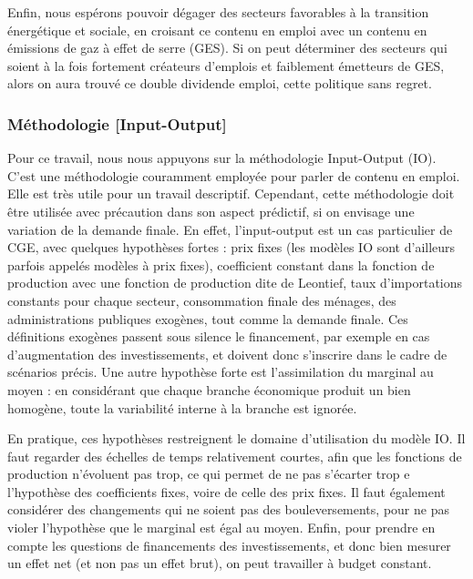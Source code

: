 Enfin, nous espérons pouvoir dégager des secteurs favorables à la transition énergétique et sociale, en croisant ce contenu en emploi avec un contenu en émissions de gaz à effet de serre (GES). Si on peut déterminer des secteurs qui soient à la fois fortement créateurs d’emplois et faiblement émetteurs de GES, alors on aura trouvé ce double dividende emploi, cette politique sans regret. 

\subsubsection{Méthodologie [Input-Output]}
Pour ce travail, nous nous appuyons sur la méthodologie Input-Output (IO). 
C’est une méthodologie couramment employée pour parler de contenu en emploi. Elle est très utile pour un travail descriptif.
Cependant, cette méthodologie doit être utilisée avec précaution dans son aspect prédictif, si on envisage une variation de la demande finale. En effet, l’input-output est un cas particulier de CGE, avec quelques hypothèses fortes : prix fixes (les modèles IO sont d’ailleurs parfois appelés modèles à prix fixes), coefficient constant dans la fonction de production avec une fonction de production dite de Leontief, taux d’importations constants pour chaque secteur, consommation finale des ménages, des administrations publiques exogènes, tout comme la demande finale. Ces définitions exogènes passent sous silence le financement, par exemple en cas d’augmentation des investissements, et doivent donc s'inscrire dans le cadre de scénarios précis. Une autre hypothèse forte est l'assimilation du marginal au moyen : en considérant que chaque branche économique produit un bien homogène, toute la variabilité interne à la branche est ignorée.

En pratique, ces hypothèses restreignent le domaine d’utilisation du modèle IO. Il faut regarder des échelles de temps relativement courtes, afin que les fonctions de production n’évoluent pas trop, ce qui permet de ne pas s’écarter trop e l’hypothèse des coefficients fixes, voire de celle des prix fixes. Il faut également considérer des changements qui ne soient pas des bouleversements, pour ne pas violer l’hypothèse que le marginal est égal au moyen.
Enfin, pour prendre en compte les questions de financements des investissements, et donc bien mesurer un effet net (et non pas un effet brut), on peut travailler à budget constant.

